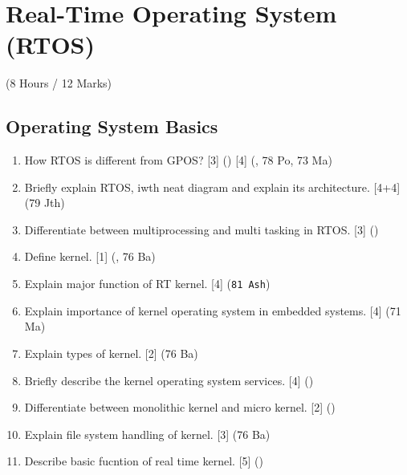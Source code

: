 \documentclass[12pt]{article}
\begin{document}
\pagebreak

\section{Real-Time Operating System (RTOS)}
  \begin{center}(8 Hours / 12 Marks)\end{center}
  
  \subsection{Operating System Basics}
    \begin{enumerate}
      \item How RTOS is different from GPOS? \hfill [3] () [4] (, 78 Po, 73 Ma)

      \item Briefly explain RTOS, iwth neat diagram and explain its architecture. \hfill [4+4] (79 Jth)

      \item Differentiate between multiprocessing and multi tasking in RTOS. \hfill [3] ()

      \item Define kernel. \hfill [1] (, 76 Ba)
      
      \item Explain major function of RT kernel. \hfill [4] (\texttt{81 Ash})

      \item Explain importance of kernel operating system in embedded systems. \hfill [4] (71 Ma)

      \item Explain types of kernel. \hfill [2] (76 Ba)

      \item Briefly describe the kernel operating system services. \hfill [4] ()

      \item Differentiate between monolithic kernel and micro kernel. \hfill [2] ()

      \item Explain file system handling of kernel. \hfill [3] (76 Ba)

      \item Describe basic fucntion of real time kernel. \hfill [5] ()
    \end{enumerate}
\end{document}
